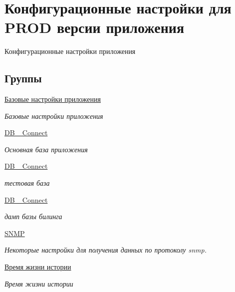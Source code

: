 \hypertarget{group__config__prod}{\section{Конфигурационные настройки для P\-R\-O\-D версии приложения}
\label{group__config__prod}
}


Конфигурационные настройки приложения  


\subsection*{Группы}
\begin{DoxyCompactItemize}
\item 
\hyperlink{group__basic__config}{Базовые настройки приложения}
\begin{DoxyCompactList}\small\item\em Базовые настройки приложения \end{DoxyCompactList}\item 
\hyperlink{group___d_b__1}{D\-B\-\_ Connect}
\begin{DoxyCompactList}\small\item\em Основная база приложения \end{DoxyCompactList}\item 
\hyperlink{group___d_b__2}{D\-B\-\_ Connect}
\begin{DoxyCompactList}\small\item\em тестовая база \end{DoxyCompactList}\item 
\hyperlink{group___d_b__3}{D\-B\-\_ Connect}
\begin{DoxyCompactList}\small\item\em дамп базы билинга \end{DoxyCompactList}\item 
\hyperlink{group__snmp}{S\-N\-M\-P}
\begin{DoxyCompactList}\small\item\em Некоторые настройки для получения данных по протоколу snmp. \end{DoxyCompactList}\item 
\hyperlink{group__time__clean}{Время жизни истории}
\begin{DoxyCompactList}\small\item\em Время жизни истории \end{DoxyCompactList}\item 

\end{DoxyCompactItemize}
